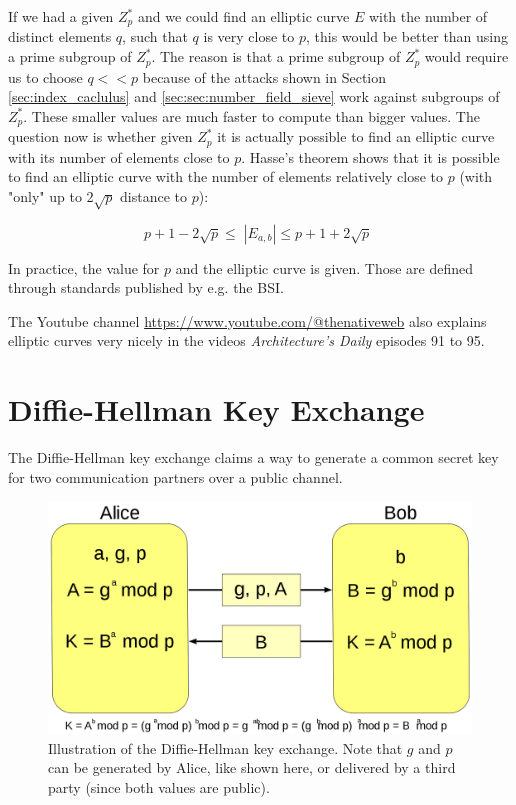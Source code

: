 If we had a given $Z_p^*$ and we could find an elliptic curve $E$ with the number of distinct elements $q$, such that $q$ is very close to $p$, this would be better than using a prime subgroup of $Z_p^*$.
The reason is that a prime subgroup of $Z_p^*$ would require us to choose $q << p$ because of the attacks shown in Section \ref{sec:index_caclulus} and \ref{sec:sec:number_field_sieve} work against subgroups of $Z_p^*$.
These smaller values are much faster to compute than bigger values.
The question now is whether given $Z_p^*$ it is actually possible to find an elliptic curve with its number of elements close to $p$.
Hasse's theorem shows that it is possible to find an elliptic curve with the number of elements relatively close to $p$ (with "only" up to $2\sqrt{p}$ distance to $p$):

$$
    p+1 - 2 \sqrt{p} \leq \; |E_{a,b}| \leq p+1 + 2 \sqrt{p}\;
$$

In practice, the value for $p$ and the elliptic curve is given.
Those are defined through standards published by e.g. the BSI.

The Youtube channel \url{https://www.youtube.com/@thenativeweb} also explains elliptic curves very nicely in the videos \textit{Architecture's Daily} episodes 91 to 95.

\section{Diffie-Hellman Key Exchange}\label{sec:diffie_hellman}

The Diffie-Hellman key exchange claims a way to generate a common secret key for two communication partners over a public channel.

\begin{figure}[h]
    \center
    \includegraphics[width=\linewidth]{gfx/diffie-helman.png}
    \caption{Illustration of the Diffie-Hellman key exchange. Note that $g$ and $p$ can be generated by Alice, like shown here, or delivered by a third party (since both values are public).}
    \label{fig:diffie_hellman}
\end{figure}


